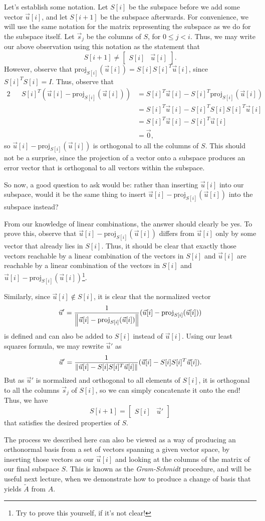 \documentclass[letterpaper]{article}
\theoremstyle{remark}
\renewcommand{\tilde}[1]{\widetilde{#1}}
\newcommand{\mat}[1]{\ensuremath{\begin{bmatrix}#1\end{bmatrix}}}
\newcommand{\eqn}[1]{\begin{alignat*}{2}#1\end{alignat*}}
\begin{document}
Let's establish some notation. Let $S[i]$ be the subspace before we add some vector $\vec{u}[i]$, and let $S[i + 1]$ be the subspace afterwards. For convenience, we will use the same notation for the matrix representing the subspace as we do for the subspace itself. Let $\vec{s}_j$ be the columns of $S$, for $0 \le j < i$. Thus, we may write our above observation using this notation as the statement that
\[
    S[i + 1] \ne \mat{S[i] & \vec{u}[i]}.
\]
However, observe that $\text{proj}_{S[i]}(\vec{u}[i]) = S[i]S[i]^T\vec{u}[i]$, since $S[i]^TS[i] = I$. Thus, observe that
\eqn{
    && S[i]^T(\vec{u}[i] - \text{proj}_{S[i]}(\vec{u}[i])) &= S[i]^T \vec{u}[i] - S[i]^T\text{proj}_{S[i]}(\vec{u}[i]) \\
    &&&= S[i]^T\vec{u}[i] - S[i]^TS[i]S[i]^T\vec{u}[i] \\
    &&&= S[i]^T\vec{u}[i] - S[i]^T\vec{u}[i] \\
    &&&= \vec{0},
}
so $\vec{u}[i] - \text{proj}_{S[i]}(\vec{u}[i])$ is orthogonal to all the columns of $S$. This should not be a surprise, since the projection of a vector onto a subspace produces an error vector that is orthogonal to all vectors within the subspace.

So now, a good question to ask would be: rather than inserting $\vec{u}[i]$ into our subspace, would it be the same thing to insert $\vec{u}[i] - \text{proj}_{S[i]}(\vec{u}[i])$ into the subspace instead? 

From our knowledge of linear combinations, the answer should clearly be yes. To prove this, observe that $\vec{u}[i] - \text{proj}_{S[i]}(\vec{u}[i])$ differs from $\vec{u}[i]$ only by some vector that already lies in $S[i]$. Thus, it should be clear that exactly those vectors reachable by a linear combination of the vectors in $S[i]$ and $\vec{u}[i]$ are reachable by a linear combination of the vectors in $S[i]$ and $\vec{u}[i] - \text{proj}_{S[i]}(\vec{u}[i])$\footnote{Try to prove this yourself, if it's not clear!}.

Similarly, since $\vec{u}[i] \not\in S[i]$, it is clear that the normalized vector 
\[
    \vec{u}' = \frac{1}{\norm{\vec{u}[i] - \text{proj}_{S[i]}(\vec{u}[i])}}(\vec{u}[i] - \text{proj}_{S[i]}(\vec{u}[i]))
\]
is defined and can also be added to $S[i]$ instead of $\vec{u}[i]$. Using our least squares formula, we may rewrite $\vec{u}'$ as
\[
    \vec{u}' = \frac{1}{\norm{\vec{u}[i] - S[i]S[i]^T\vec{u}[i]}} (\vec{u}[i] - S[i]S[i]^T\vec{u}[i]).
\]
But as $\vec{u}'$ is normalized and orthogonal to all elements of $S[i]$, it is orthogonal to all the columns $\vec{s}_j$ of $S[i]$, so we can simply concatenate it onto the end! Thus, we have
\[
    S[i + 1] = \mat{S[i] & \vec{u}'}
\]
that satisfies the desired properties of $S$.

The process we described here can also be viewed as a way of producing an orthonormal basis from a set of vectors spanning a given vector space, by inserting those vectors as our $\vec{u}[i]$ and looking at the columns of the matrix of our final subspace $S$. This is known as the \emph{Gram-Schmidt} procedure, and will be useful next lecture, when we demonstrate how to produce a change of basis that yields $\tilde{A}$ from $A$.
\end{document}
